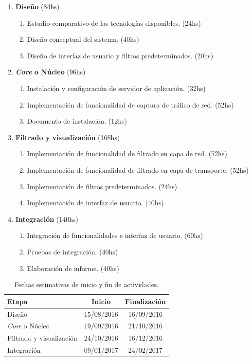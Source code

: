 \begin{enumerate}
	\item \textbf{Diseño} (84hs)
	\begin{enumerate}
		\item Estudio comparativo de las tecnologías disponibles. (24hs)
		\item Diseño conceptual del sistema. (40hs)
		\item Diseño de interfaz de usuario y filtros predeterminados. (20hs)
	\end{enumerate}
	\item \textbf{\textit{Core} o Núcleo} (96hs)
	\begin{enumerate}
		\item Instalación y configuración de servidor de aplicación. (32hs)
		\item Implementación de funcionalidad de captura de tráfico de red. (52hs)
		\item Documento de instalación. (12hs)
	\end{enumerate}
	\item \textbf{Filtrado y visualización} (168hs)
	\begin{enumerate}
		\item Implementación de funcionalidad de filtrado en capa de red. (52hs)
		\item Implementación de funcionalidad de filtrado en capa de transporte. (52hs)
		\item Implementación de filtros predeterminados. (24hs)
		\item Implementación de interfaz de usuario. (40hs)
	\end{enumerate}
	\item \textbf{Integración} (140hs)
	\begin{enumerate}
		\item Integración de funcionalidades e interfaz de usuario. (60hs)
		\item Pruebas de integración. (40hs)
		\item Elaboración de informe. (40hs)
	\end{enumerate}
\end{enumerate}

\begin{table}[bp]
	\begin{center}	
		\begin{tabular}{|l|c|c|}
			\hline 
			Etapa & Inicio & Finalización \\ \hline
			Diseño & 15/08/2016 & 16/09/2016 \\
			\textit{Core} o Núcleo & 19/09/2016 & 21/10/2016 \\
			Filtrado y visualización & 24/10/2016 & 16/12/2016 \\
			Integración & 09/01/2017 & 24/02/2017 \\ \hline
		\end{tabular}
	\end{center}
	\caption{Fechas estimativas de inicio y fin de actividades.}
	\label{table:cronograma}
\end{table}


